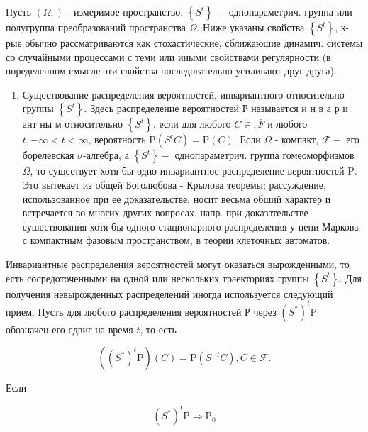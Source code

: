 \documentclass[10pt]{article}
\begin{document}
Пусть $(\Omega, \widetilde{\mathscr{}})$ - измеримое пространство, $\left\{S^{t}\right\}-$ однопараметрич. группа или полугруппа преобразований пространства $\Omega$. Ниже указаны свойства $\left\{S^{t}\right\}$, к-рые обычно рассматриваются как стохастические, сближаюшие динамич. системы со случайными процессами с теми или иными свойствами регулярности (в определенном смысле эти свойства последовательно усиливают друг друга).



\begin{enumerate}

  \item Существование распределения вероятностей, инвариантного относительно группы $\left\{S^{t}\right\}$. Здесь распределение вероятностей Р называется и н в а р и ант ны м относительно $\left\{S^{t}\right\}$, если для любого $C \in, \bar{F}$ и любого $t,-\infty<t<\infty$, вероятность $\mathrm{P}\left(S^{t} C\right)=\mathrm{P}(C)$. Если $\Omega$ - компакт, $\mathscr{F}-$ его борелевская $\sigma$-алгебра, а $\left\{S^{t}\right\}-$ однопараметрич. группа гомеоморфизмов $\Omega$, то существует хотя бы одно инвариантное распределение вероятностей $\mathrm{P}$. Это вытекает из общей Боголюбова - Крылова теоремы; рассуждение, использованное при ее доказательстве, носит весьма обший характер и встречается во многих других вопросах, напр. при доказательстве сушествования хотя бы одного стационарного распределения у цепи Маркова с компактным фазовым пространством, в теории клеточных автоматов.

\end{enumerate}



Инвариантные распределения вероятностей могут оказаться вырожденными, то есть сосредоточенными на одной или нескольких траекториях группы $\left\{S^{t}\right\}$. Для получения невырожденных распределений иногда используется следующий прием. Пусть для любого распределения вероятностей Р через $\left(S^{*}\right)^{t} \mathrm{P}$ обозначен его сдвиг на время $t$, то есть



\[

\left(\left(S^{*}\right)^{t} \mathrm{P}\right)(C)=\mathrm{P}\left(S^{-t} C\right), C \in \mathscr{F} .

\]



Если



\[

\left(S^{*}\right)^{t} \mathrm{P} \Rightarrow \mathrm{P}_{0}

\]
\end{document}

